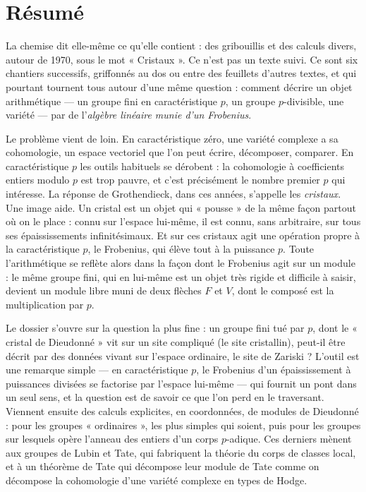 \documentclass[11pt,a4paper]{article}
\begin{document}
\section*{Résumé}

\begin{resume}
La chemise dit elle-même ce qu'elle contient : des gribouillis et des calculs
divers, autour de 1970, sous le mot « Cristaux ». Ce n'est pas un texte suivi.
Ce sont six chantiers successifs, griffonnés au dos ou entre des feuillets
d'autres textes, et qui pourtant tournent tous autour d'une même question :
comment décrire un objet arithmétique — un groupe fini en caractéristique $p$,
un groupe $p$-divisible, une variété — par de l'\emph{algèbre linéaire munie
d'un Frobenius}.

Le problème vient de loin. En caractéristique zéro, une variété complexe a sa
cohomologie, un espace vectoriel que l'on peut écrire, décomposer, comparer.
En caractéristique $p$ les outils habituels se dérobent : la cohomologie à
coefficients entiers modulo $p$ est trop pauvre, et c'est précisément le
nombre premier $p$ qui intéresse. La réponse de Grothendieck, dans ces années,
s'appelle les \emph{cristaux}. Une image aide. Un cristal est un objet qui
« pousse » de la même façon partout où on le place : connu sur l'espace
lui-même, il est connu, sans arbitraire, sur tous ses épaississements
infinitésimaux. Et sur ces cristaux agit une opération propre à la
caractéristique $p$, le Frobenius, qui élève tout à la puissance $p$. Toute
l'arithmétique se reflète alors dans la façon dont le Frobenius agit sur un
module : le même groupe fini, qui en lui-même est un objet très rigide et
difficile à saisir, devient un module libre muni de deux flèches $F$ et $V$,
dont le composé est la multiplication par $p$.

Le dossier s'ouvre sur la question la plus fine : un groupe fini tué par $p$,
dont le « cristal de Dieudonné » vit sur un site compliqué (le site
cristallin), peut-il être décrit par des données vivant sur l'espace ordinaire,
le site de Zariski ? L'outil est une remarque simple — en caractéristique $p$,
le Frobenius d'un épaississement à puissances divisées se factorise par
l'espace lui-même — qui fournit un pont dans un seul sens, et la question est
de savoir ce que l'on perd en le traversant. Viennent ensuite des calculs
explicites, en coordonnées, de modules de Dieudonné : pour les groupes
« ordinaires », les plus simples qui soient, puis pour les groupes sur
lesquels opère l'anneau des entiers d'un corps $p$-adique. Ces derniers
mènent aux groupes de Lubin et Tate, qui fabriquent la théorie du corps de
classes local, et à un théorème de Tate qui décompose leur module de Tate
comme on décompose la cohomologie d'une variété complexe en types de Hodge.


\end{resume}
\end{document}
